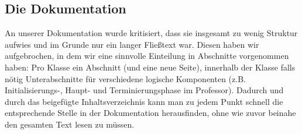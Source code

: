 \documentclass[12pt,a4paper]{article}
\begin{document}
\subsection{Die Dokumentation}
An unserer Dokumentation wurde kritisiert, dass sie insgesamt zu wenig Struktur aufwies und im Grunde nur ein langer Fließtext war. Diesen haben wir aufgebrochen, in dem wir eine sinnvolle Einteilung in Abschnitte vorgenommen haben: Pro Klasse ein Abschnitt (und eine neue Seite), innerhalb der Klasse falls nötig Unterabschnitte für verschiedene logische Komponenten (z.B. Initialisierungs-, Haupt- und Terminierungsphase im Professor). Dadurch und durch das beigefügte Inhaltsverzeichnis kann man zu jedem Punkt schnell die entsprechende Stelle in der Dokumentation herausfinden, ohne wie zuvor beinahe den gesamten Text lesen zu müssen.
\end{document}
